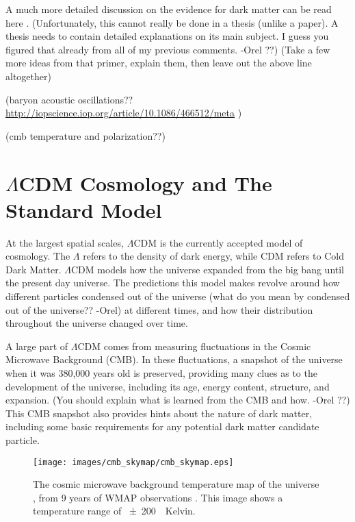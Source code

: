     A much more detailed discussion on the evidence for dark matter can be read here \cite{DMPrimer}.
    {\color{red}(Unfortunately, this cannot really be done in a thesis (unlike a paper). A thesis needs to contain detailed explanations on its main subject. I guess you figured that already from all of my previous comments. -Orel ??)}
    {\color{red}(Take a few more ideas from that primer, explain them, then leave out the above line altogether)}

    {\color{red}(baryon acoustic oscillations?? \url{http://iopscience.iop.org/article/10.1086/466512/meta} )}
    
    
    {\color{red}(cmb temperature and polarization??)}
    

\section{$\Lambda$CDM Cosmology and The Standard Model}

  At the largest spatial scales, $\Lambda$CDM is the currently accepted model of cosmology.
  The $\Lambda$ refers to the density of dark energy, while CDM refers to Cold Dark Matter.
  $\Lambda$CDM models how the universe expanded from the big bang until the present day universe.
  The predictions this model makes revolve around how different particles {\color{red}condensed out of the universe (what do you mean by condensed out of the universe?? -Orel)} at different times, and how their distribution throughout the universe changed over time.

  A large part of $\Lambda$CDM comes from measuring fluctuations in the Cosmic Microwave Background (CMB).
  In these fluctuations, a snapshot of the universe when it was 380,000 years old is preserved, providing many clues as to the development of the universe, including its age, energy content, structure, and expansion. 
  {\color{red}(You should explain what is learned from the CMB and how. -Orel ??)}
  This CMB snapshot also provides hints about the nature of dark matter, including some basic requirements for any potential dark matter candidate particle.

  \begin{figure}[ht]
    \texttt{[image: images/cmb\_skymap/cmb\_skymap.eps]}
    \caption[The Cosmic Microwave Background]{
      The cosmic microwave background temperature map of the universe \cite{wmap_skymap}, from 9 years of WMAP observations \cite{wmap9year}.
      This image shows a temperature range of \SI{\pm200}{\mu{}Kelvin}.
    }
    \label{fig:cmb}
  \end{figure}

